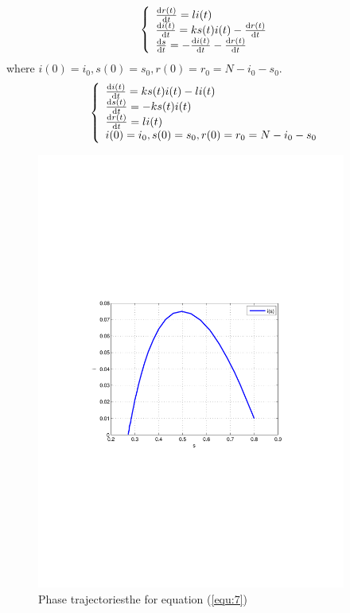 \begin{equation}
\left\{
\begin{array}{l}
\frac{{\mathrm{d}}r(t)}{{\mathrm{d}}t}=li(t)\\
\frac{{\mathrm{d}}i(t)}{{\mathrm{d}}t}=ks(t)i(t)-\frac{{\mathrm{d}}r(t)}{{\mathrm{d}}t}\\
\frac{{\mathrm{d}}s}{{\mathrm{d}}t}=-\frac{{\mathrm{d}}i(t)}{{\mathrm{d}}t}-\frac{{\mathrm{d}}r(t)}{{\mathrm{d}}t}
\end{array}\right.
\label{equ:6}
\end{equation}%
%
where $ i(0)=i_0,s(0)=s_0,r(0)=r_0=N-i_0-s_0 $.
%
\begin{equation}
\left\{
\begin{array}{l}
\frac{{\mathrm{d}}i(t)}{{\mathrm{d}}t}=ks(t)i(t)-li(t)\\
\frac{{\mathrm{d}}s(t)}{{\mathrm{d}}t}=-ks(t)i(t)\\
\frac{{\mathrm{d}}r(t)}{{\mathrm{d}}t}=li(t)\\
i(0)=i_0,s(0)=s_0,r(0)=r_0=N-i_0-s_0
\end{array}\right.
\label{equ:7}
\end{equation}
\begin{figure}
\centering
\includegraphics[width=4in]{imgs/sars3_2.pdf}
\caption{Phase trajectoriesthe for equation (\ref{equ:7})}
\label{fig:2}
\end{figure}
